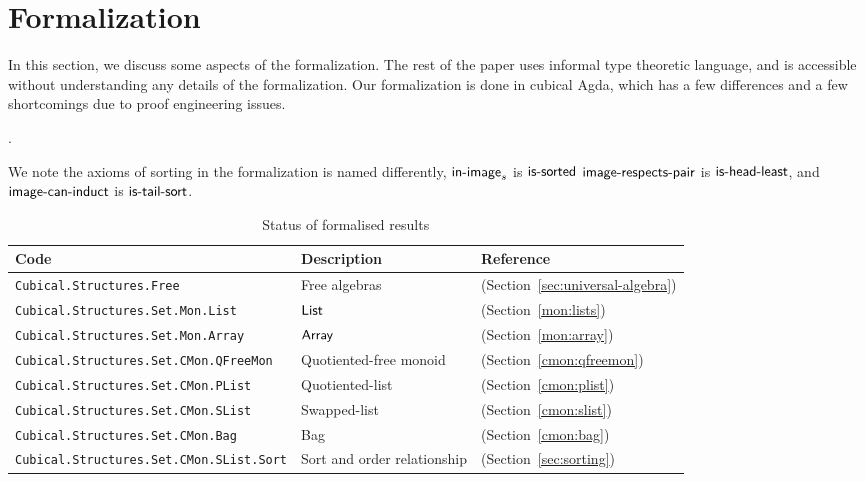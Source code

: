 \section{Formalization}
\label{sec:formalization}

In this section, we discuss some aspects of the formalization.
The rest of the paper uses informal type theoretic language,
and is accessible without understanding any details of the formalization.
Our formalization is done in cubical Agda, which has a few differences and a few
shortcomings due to proof engineering issues.

.

We note the axioms of sorting in the formalization is named differently,
$\operatorname{\mathsf{in-image}}_s$ is $\operatorname{\mathsf{is-sorted}}$
$\operatorname{\mathsf{image-respects-pair}}$ is $\operatorname{\mathsf{is-head-least}}$, and
$\operatorname{\mathsf{image-can-induct}}$ is $\operatorname{\mathsf{is-tail-sort}}$.

\begin{table}[h]
\centering
\begin{tabular}{lll}
\hline
\textbf{Code} & \textbf{Description} & \textbf{Reference}               \\ \hline
\texttt{Cubical.Structures.Free}         & Free algebras            & (Section~\cref{sec:universal-algebra}) \\
\texttt{Cubical.Structures.Set.Mon.List} & $\operatorname{\mathsf{List}}$  & (Section~\cref{mon:lists}) \\
\texttt{Cubical.Structures.Set.Mon.Array} & $\operatorname{\mathsf{Array}}$  & (Section~\cref{mon:array})\\
\texttt{Cubical.Structures.Set.CMon.QFreeMon} & Quotiented-free monoid & (Section~\cref{cmon:qfreemon}) \\
\texttt{Cubical.Structures.Set.CMon.PList} & Quotiented-list & (Section~\cref{cmon:plist}) \\
\texttt{Cubical.Structures.Set.CMon.SList} & Swapped-list & (Section~\cref{cmon:slist}) \\
\texttt{Cubical.Structures.Set.CMon.Bag} & Bag & (Section~\cref{cmon:bag}) \\
\texttt{Cubical.Structures.Set.CMon.SList.Sort} & Sort and order relationship & (Section~\cref{sec:sorting}) \\
\hline
\end{tabular}
\caption{Status of formalised results}
\label{tab:formalised_results}
\end{table}


